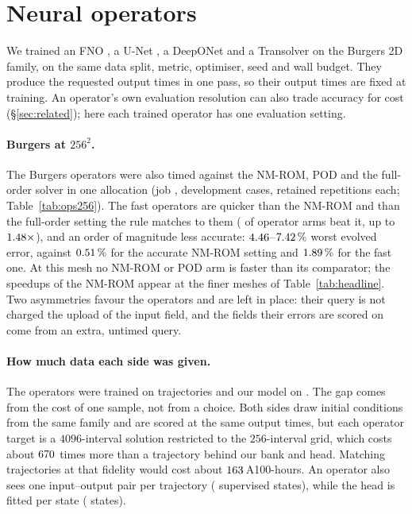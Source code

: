 

\clearpage
\section{Neural operators}
\label{app:operators}
We trained an FNO \citep{Li2020FNO}, a U-Net \citep{Ronneberger2015UNet},
a DeepONet \citep{Lu2021DeepONet} and a Transolver \citep{WuTransolver2024}
on the Burgers 2D family, on the same data split, metric, optimiser, seed
and wall budget. They produce the requested output times in one pass, so
their output times are fixed at training. An operator's own evaluation
resolution can also trade accuracy for cost (\S\ref{sec:related}); here
each trained operator has one evaluation setting.

\paragraph{Burgers at $256^2$.}
The Burgers operators were also timed against the NM-ROM, POD and the
full-order solver in one allocation (job \nOpsTwoDJob{},
\nOpsTwoDCases{} development cases, \nOpsTwoDReps{} retained repetitions
each; Table~\ref{tab:ops256}). The fast operators are quicker than the
NM-ROM and than the full-order setting the rule matches to them
(\nOpsTwoDOpFaster{} of \nOpsTwoDOpArms{} operator arms beat it, up to
$1.48\times$), and an order of magnitude less accurate:
$4.46$--$7.42\,\%$ worst evolved error, against
$0.51\,\%$ for the accurate NM-ROM setting and
$1.89\,\%$ for the fast one. At this mesh no NM-ROM or POD
arm is faster than its comparator; the speedups of the NM-ROM appear at
the finer meshes of Table~\ref{tab:headline}. Two asymmetries favour the
operators and are left in place: their query is not charged the upload of
the input field, and the fields their errors are scored on come from an
extra, untimed query.

\paragraph{How much data each side was given.}
The operators were trained on \nParOpTraj{} trajectories and our model
on \nParRomTraj{}. The gap comes from the cost of one sample, not from a
choice. Both sides draw initial conditions from the same family and are
scored at the same output times, but each operator target is a
$4096$-interval solution restricted to the $256$-interval grid, which
costs about $670$ times more than a trajectory behind our bank
and head. Matching \nParRomTraj{} trajectories at that fidelity would
cost about $163$\,A100-hours. An operator also sees one
input--output pair per trajectory (\nParOpStates{} supervised states),
while the head is fitted per state (\nParRomStates{} states).

